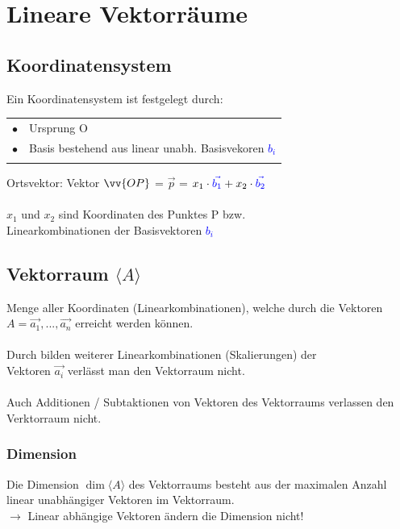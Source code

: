  \section{Lineare Vektorräume} 
		  
		  	\subsection{Koordinatensystem}
		  	Ein Koordinatensystem ist festgelegt durch: \\
		  	\begin{tabular}{ll}
		  	$\bullet$ & Ursprung O \\
		  	$\bullet$ & Basis bestehend aus linear unabh. Basisvekoren \textcolor{blue}{$b_i$} \\
		  	\\
		  	\end{tabular}
		  	
		  	Ortsvektor: \quad Vektor $\vv{OP}$ = $\vec{p}$ = $x_1 \cdot \textcolor{blue}{\vec{b_1}} + x_2 \cdot \textcolor{blue}{\vec{b_2}}$ \\
		  	\\
		  	$x_1$ und $x_2$ sind Koordinaten des Punktes P bzw. \\
		  	Linearkombinationen der Basisvektoren \textcolor{blue}{$b_i$}
		  	
		  	
			\subsection{Vektorraum  $\langle A \rangle$}		  
			Menge aller Koordinaten (Linearkombinationen), welche durch die Vektoren $A = \vec{a_1}, ... , \vec{a_n}$ erreicht werden können. \\
			\\
			Durch bilden weiterer Linearkombinationen (Skalierungen) der \\			
			Vektoren $\vec{a_i}$ verlässt man den Vektorraum nicht.\\
			\\
			Auch Additionen / Subtaktionen von Vektoren des Vektorraums verlassen den Verktorraum nicht. \\

			\subsubsection{Dimension}
			Die Dimension $\dim \langle A \rangle$ des Vektorraums besteht aus der maximalen Anzahl linear unabhängiger Vektoren im Vektorraum. \\
			$\rightarrow$ Linear abhängige Vektoren ändern die Dimension nicht!	  	
		  	
